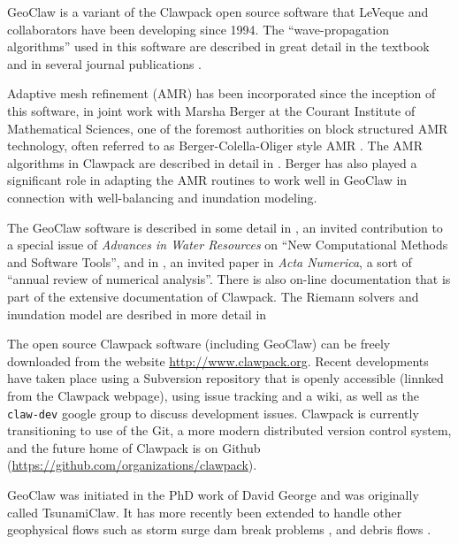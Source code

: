 \documentclass[11pt]{article}
\begin{document}
GeoClaw is a variant of the Clawpack open source
software \cite{claw.org} that LeVeque and collaborators have
been developing since 1994.  The ``wave-propagation algorithms'' used in
this software are described in great detail in the textbook
\cite{rjl:fvmhp} and in several journal publications
\cite{rjl:advect,rjl:waveprop,jol-rjl:3d}.


Adaptive mesh refinement (AMR) has been
incorporated since the inception of this software, 
in joint work with Marsha Berger at the
Courant Institute of Mathematical Sciences, one of the foremost authorities
on block structured AMR technology, often referred to as
Berger-Colella-Oliger style AMR \cite{berger-colella, berger-oliger}.  The
AMR algorithms in Clawpack are described in detail in
\cite{mjb-rjl:amrclaw}.  
Berger has also played a significant role in adapting the AMR routines to
work well in GeoClaw \cite{BergerGeorgeLeVequeMandli:awr11,
LeVequeGeorgeBerger:an11} in connection with well-balancing and inundation
modeling.

The GeoClaw software is described in some detail in
\cite{BergerGeorgeLeVequeMandli:awr11}, an invited contribution to a special
issue of
{\it Advances in Water Resources} on
``New Computational Methods and Software Tools'',
and in \cite{LeVequeGeorgeBerger:an11}, an invited paper in {\it Acta
Numerica}, a sort of ``annual review of numerical analysis''.
There is also 
on-line documentation \cite{geoclaw-doc} that is part of the extensive
documentation of Clawpack.
The Riemann solvers and inundation model are desribed in more detail in
\cite{dgeorge:phd,George2008}

The open source Clawpack software (including GeoClaw) can be freely
downloaded from the website \url{http://www.clawpack.org}.  
Recent developments have taken
place using a Subversion repository that is openly accessible (linnked from
the Clawpack webpage), using issue tracking and a wiki, as well as the {\tt
claw-dev} google group to discuss development issues.  Clawpack is currently
transitioning to use of the Git, a more modern distributed version control
system, and the future home of Clawpack is on Github
(\url{https://github.com/organizations/clawpack}).

GeoClaw was initiated in the PhD work of David George
\cite{dgeorge:phd,rjl-george:catalina04a,dg-rjl:tsunami06,George2008} and
was originally called TsunamiClaw.  It has more recently been extended to
handle other geophysical flows such as storm surge \cite{mandli:phd}
dam break problems \cite{George:Malpasset}, and debris flows
\cite{GeorgeIverson2011}.
\end{document}
